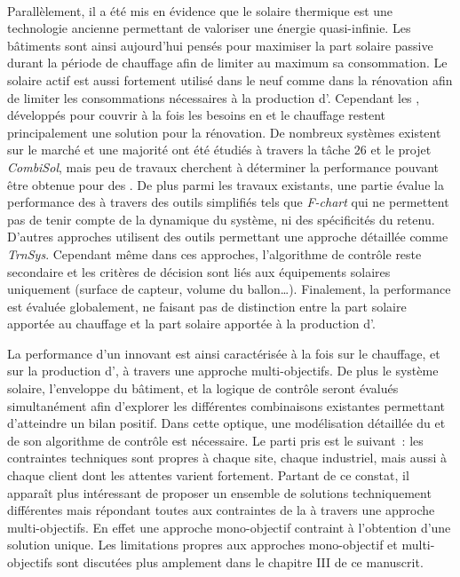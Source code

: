 \paragraph{} %
Parallèlement, il a été mis en évidence que le solaire thermique est une technologie ancienne
permettant de valoriser une énergie quasi-infinie. Les bâtiments sont ainsi aujourd’hui
pensés pour maximiser la part solaire passive durant la période de chauffage afin de
limiter au maximum sa consommation. Le solaire actif est aussi fortement utilisé dans le
neuf comme dans la rénovation afin de limiter les consommations nécessaires à la
production d’. Cependant les , développés pour couvrir à la fois les
besoins en  et le chauffage restent principalement une solution pour la
rénovation. De nombreux systèmes existent sur le marché et une majorité ont été étudiés à
travers la tâche $26$ et le projet \textit{CombiSol}, mais peu de travaux cherchent à
déterminer la performance pouvant être obtenue pour des . De plus parmi les
travaux existants, une partie évalue la performance des  à travers des outils
simplifiés tels que \textit{F-chart} qui ne permettent pas de tenir compte de la dynamique
du système, ni des spécificités du  retenu. D’autres approches utilisent des
outils permettant une approche détaillée comme \textit{TrnSys}. Cependant
même dans ces approches, l’algorithme de contrôle reste secondaire et les critères de
décision sont liés aux équipements solaires uniquement (surface de capteur, volume du
ballon\dots). Finalement, la performance est évaluée globalement, ne faisant pas de
distinction entre la part solaire apportée au chauffage et la part solaire apportée à la
production d’.

La performance d’un  innovant est ainsi caractérisée à la
fois sur le chauffage, et sur la production d’, à travers une approche
multi-objectifs. De plus le système solaire, l’enveloppe du bâtiment, et la logique de contrôle
seront évalués simultanément afin d’explorer les différentes combinaisons existantes
permettant d’atteindre un bilan positif.
Dans cette optique, une modélisation détaillée du  et de son algorithme de
contrôle est nécessaire. Le parti pris est le suivant~: les contraintes techniques sont
propres à chaque site, chaque industriel, mais aussi à chaque client dont les attentes
varient fortement. Partant de ce constat, il apparaît plus intéressant de proposer
un ensemble de solutions techniquement différentes mais répondant toutes aux contraintes
de la  à travers une approche multi-objectifs. En effet une approche mono-objectif
contraint à l’obtention d’une solution unique. Les limitations propres aux approches
mono-objectif et multi-objectifs sont discutées plus amplement dans le chapitre III de ce
manuscrit.


